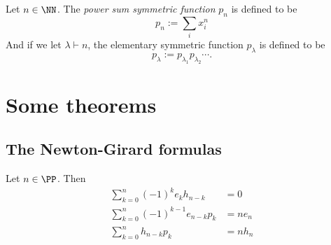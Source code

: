 \documentclass{article}
\begin{document}
\begin{definition}
    Let $n\in\NN$. The \textit{power sum symmetric function} $p_n$ is defined to be
    \[
        p_n := \sum_{i} x_i^n
    \]
    And if we let $\lambda \vdash n$, the elementary symmetric function $p_\lambda$ is defined to be
    \[
        p_\lambda := p_{\lambda_1}p_{\lambda_2}\cdots.
    \]
\end{definition}

\section{Some theorems}

\subsection{The Newton-Girard formulas}

\begin{theorem}
    Let $n \in \PP$. Then
    \begin{align}
        \sum_{k=0}^n (-1)^k e_kh_{n-k} &= 0 \label{ng1} \\
        \sum_{k=0}^n (-1)^{k-1} e_{n-k}p_k &= ne_n  \label{ng2} \\
        \sum_{k=0}^n h_{n-k}p_k &= nh_n \label{ng3}
    \end{align}
\end{theorem}
\end{document}
